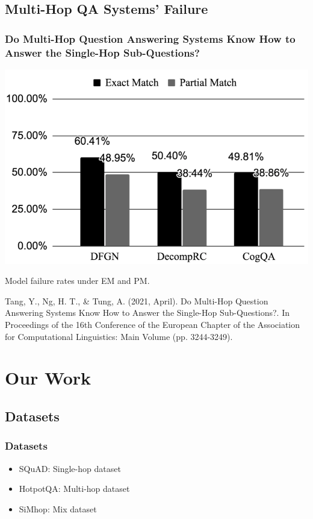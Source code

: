 \documentclass[]{beamer}
\begin{document}
\subsection{Multi-Hop QA Systems' Failure}
\begin{frame}
\frametitle{Do Multi-Hop Question Answering Systems Know How to Answer the Single-Hop Sub-Questions?}

\centering
\includegraphics[scale=0.16]{4.png}

\centering
\tiny{Model failure rates under EM and PM.}
\bigskip

\tiny{ {\color{gray} Tang, Y., Ng, H. T., \& Tung, A. (2021, April). Do Multi-Hop Question Answering Systems Know How to Answer the Single-Hop Sub-Questions?. In Proceedings of the 16th Conference of the European Chapter of the Association for Computational Linguistics: Main Volume (pp. 3244-3249).}}

\end{frame}




\section{Our Work}


\subsection{Datasets}
\begin{frame}
\frametitle{Datasets}

\begin{itemize}
\item SQuAD: Single-hop dataset
\item HotpotQA: Multi-hop dataset
\item SiMhop: Mix dataset
\end{itemize}

\end{frame}
\end{document}
